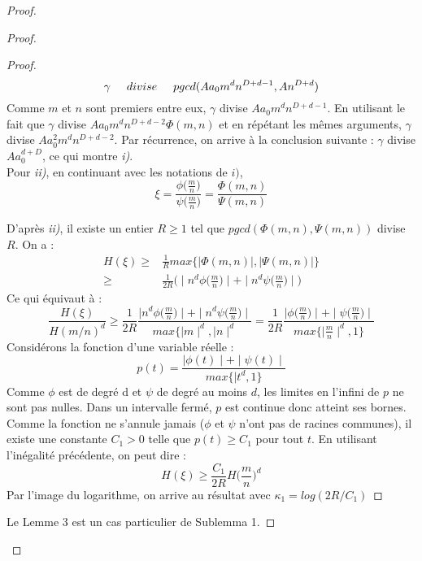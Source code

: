 \documentclass[a4paper]{article}
\begin{document}
\begin{proof}
\begin{proof}
\begin{proof}
\begin{equation*}
\gamma \hspace{0.5cm} divise \hspace{0.5cm} pgcd( Aa_{0}m^dn^{D+d-1},An^{D+d})
\end{equation*}
Comme $m$ et $n$ sont premiers entre eux, $\gamma$ divise $Aa_{0}m^dn^{D+d-1}$.
En utilisant le fait que $\gamma$ divise $Aa_{0}m^dn^{D+d-2}\Phi(m,n)$ et en répétant les mêmes arguments, $\gamma$ divise $Aa_{0}^2m^dn^{D+d-2}$. Par récurrence, on arrive à la conclusion suivante : $\gamma$ divise $Aa_{0}^{d+D}$, ce qui montre \textit{i)}. \\
Pour \textit{ii)}, 
en continuant avec les notations de $\textit{i)}$,
\begin{equation*}
\xi=\frac{\phi\Big(\frac{m}{n}\Big)}{\psi\Big(\frac{m}{n}\Big)}=\frac{\Phi(m,n)}{\Psi(m,n)}
\end{equation*}

D'après \textit{ii)}, il existe un entier $R \geqslant 1$ tel que $pgcd(\Phi(m,n),\Psi(m,n))$ divise $R$.
On a : 
\begin{align*}
H(\xi) \geqslant& \frac{1}{R} max\{\mid \Phi(m,n) \mid,\mid \Psi(m,n)\mid\} \\
\geqslant& \frac{1}{2R} \Big( \mid n^d\phi\Big(\frac{m}{n}\Big) \mid+\mid n^d\psi\Big(\frac{m}{n}\Big)\mid \Big)
\end{align*}
Ce qui équivaut à :
\begin{equation*}
\frac{H(\xi)}{H(m/n)^d} \geqslant \frac{1}{2R} \frac{\mid n^d\phi\Big(\frac{m}{n}\Big) \mid+\mid n^d\psi\Big(\frac{m}{n}\Big)\mid}{max \{ \mid m \mid^d,\mid n \mid^d } 
= \frac{1}{2R} \frac{\mid \phi\Big(\frac{m}{n}\Big) \mid+\mid \psi\Big(\frac{m}{n}\Big)\mid}{max \{ \mid \frac{m}{n} \mid^d,1 \}}
\end{equation*}
Considérons la fonction d'une variable réelle :
\begin{equation*}
p(t)= \frac{\mid \phi(t) \mid+\mid \psi(t) \mid}{max \{ \mid t^d,1 \}}
\end{equation*}
Comme $\phi$ est de degré d et $\psi$ de degré au moins $d$, les limites en l'infini de $p$ ne sont pas nulles. Dans un intervalle fermé, $p$ est continue donc atteint ses bornes. Comme la fonction ne s'annule jamais ($\phi$ et $\psi$ n'ont pas de racines communes), il existe une constante $C_{1} > 0$ telle que $p(t) \geqslant C_{1}$ pour tout $t$.
En utilisant l'inégalité précédente, on peut dire :
\begin{equation*}
H(\xi)\geqslant \frac{C_{1}}{2R} H \Big( \frac{m}{n} \Big)^d
\end{equation*}
Par l'image du logarithme, on arrive au résultat avec $\kappa_{1}=log(2R/C_{1})$ 
\end{proof}
Le Lemme 3 est un cas particulier de Sublemma 1.
\end{proof}


\end{proof}
\end{document}
